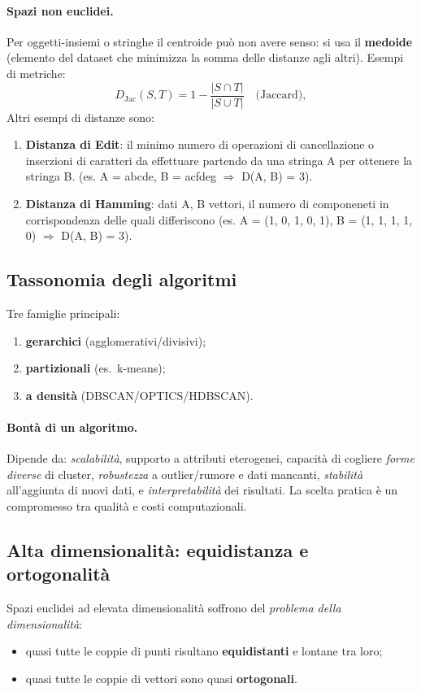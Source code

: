 \paragraph{Spazi non euclidei.}
Per oggetti-insiemi o stringhe il centroide può non avere senso: si usa il \textbf{medoide} (elemento del dataset che minimizza la somma delle distanze agli altri).
Esempi di metriche:
\[
D_\mathrm{Jac}(S,T)=1- \frac{|S\cap T|}{|S\cup T|}\quad\text{(Jaccard)},
\]
Altri esempi di distanze sono:
\begin{enumerate}
  \item \textbf{Distanza di Edit}: il minimo numero di operazioni di cancellazione o inserzioni di caratteri da effettuare partendo da una stringa A per ottenere la stringa B. (es. A = abcde, B = acfdeg $\Rightarrow$ D(A, B) = 3).
  \item \textbf{Distanza di Hamming}: dati A, B vettori, il numero di componeneti in corrispondenza delle quali differiscono (es. A = (1, 0, 1, 0, 1), B = (1, 1, 1, 1, 0) $\Rightarrow$ D(A, B) = 3).
\end{enumerate}

\subsection{Tassonomia degli algoritmi}\label{subsec:taxonomy}
Tre famiglie principali:

\begin{enumerate}
  \item \textbf{gerarchici} (agglomerativi/divisivi);
  \item \textbf{partizionali} (es.\ k-means);
  \item \textbf{a densità} (DBSCAN/OPTICS/HDBSCAN).
\end{enumerate}

\paragraph{Bontà di un algoritmo.}
Dipende da: \emph{scalabilità}, supporto a attributi eterogenei, capacità di cogliere \emph{forme diverse} di cluster, \emph{robustezza} a outlier/rumore e dati mancanti, \emph{stabilità} all’aggiunta di nuovi dati, e \emph{interpretabilità} dei risultati. La scelta pratica è un compromesso tra qualità e costi computazionali.

\subsection{Alta dimensionalità: equidistanza e ortogonalità}\label{subsec:curse}
Spazi euclidei ad elevata dimensionalità soffrono del \emph{problema della dimensionalità}:
\begin{itemize}
  \item quasi tutte le coppie di punti risultano \textbf{equidistanti} e lontane tra loro;
  \item quasi tutte le coppie di vettori sono quasi \textbf{ortogonali}.
\end{itemize}

